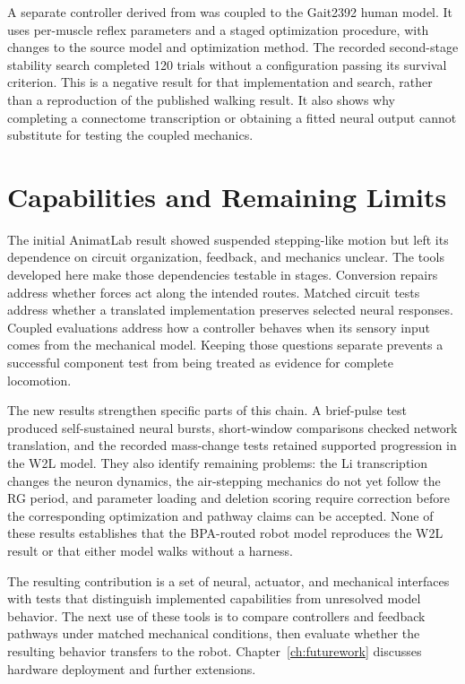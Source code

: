 A separate controller derived from \citet{dirusso_investigating_2023} was coupled to the Gait2392 human model. It uses per-muscle reflex parameters and a staged optimization procedure, with changes to the source model and optimization method. The recorded second-stage stability search completed 120 trials without a configuration passing its survival criterion. This is a negative result for that implementation and search, rather than a reproduction of the published walking result. It also shows why completing a connectome transcription or obtaining a fitted neural output cannot substitute for testing the coupled mechanics.

\section{Capabilities and Remaining Limits}\label{sec:sns_discussion}

The initial AnimatLab result showed suspended stepping-like motion but left its dependence on circuit organization, feedback, and mechanics unclear. The tools developed here make those dependencies testable in stages. Conversion repairs address whether forces act along the intended routes. Matched circuit tests address whether a translated implementation preserves selected neural responses. Coupled evaluations address how a controller behaves when its sensory input comes from the mechanical model. Keeping those questions separate prevents a successful component test from being treated as evidence for complete locomotion.

The new results strengthen specific parts of this chain. A brief-pulse test produced self-sustained neural bursts, short-window comparisons checked network translation, and the recorded mass-change tests retained supported progression in the W2L model. They also identify remaining problems: the Li transcription changes the neuron dynamics, the air-stepping mechanics do not yet follow the RG period, and parameter loading and deletion scoring require correction before the corresponding optimization and pathway claims can be accepted. None of these results establishes that the BPA-routed robot model reproduces the W2L result or that either model walks without a harness.

The resulting contribution is a set of neural, actuator, and mechanical interfaces with tests that distinguish implemented capabilities from unresolved model behavior. The next use of these tools is to compare controllers and feedback pathways under matched mechanical conditions, then evaluate whether the resulting behavior transfers to the robot. Chapter~\ref{ch:futurework} discusses hardware deployment and further extensions.
